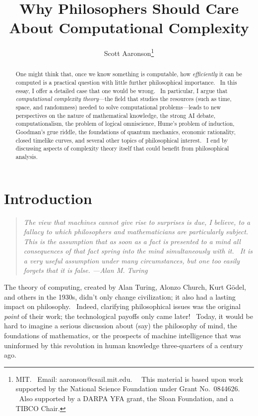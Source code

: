 \documentclass[12pt,onecolumn]{article}%
\begin{document}
\title{Why Philosophers Should Care About Computational Complexity}
\author{Scott Aaronson\thanks{MIT. \ Email: aaronson@csail.mit.edu. \ \ This material
is based upon work supported by the National Science Foundation under Grant
No.\ 0844626. \ Also supported by a DARPA YFA grant, the Sloan Foundation, and
a TIBCO Chair.}}
\date{}
\maketitle

\begin{abstract}
One might think that, once we know something is computable, how
\textit{efficiently} it can be computed is a practical question with little
further philosophical importance. \ In this essay, I offer a detailed case
that one would be wrong. \ In particular, I argue that \textit{computational
complexity theory}---the field that studies the resources (such as time,
space, and randomness) needed to solve computational problems---leads to new
perspectives on the nature of mathematical knowledge, the strong AI debate,
computationalism, the problem of logical omniscience, Hume's problem of
induction, Goodman's grue riddle, the foundations of quantum mechanics,
economic rationality, closed timelike curves, and several other topics of
philosophical interest. \ I end by discussing aspects of complexity theory
itself that could benefit from philosophical analysis.

\end{abstract}
\tableofcontents

\newpage
\section{Introduction\label{INTRO}}

\begin{quotation}
\noindent\textit{The view that machines cannot give rise to surprises is due,
I believe, to a fallacy to which philosophers and mathematicians are
particularly subject. This is the assumption that as soon as a fact is
presented to a mind all consequences of that fact spring into the mind
simultaneously with it. \ It is a very useful assumption under many
circumstances, but one too easily forgets that it is false. ---Alan M. Turing
\cite{turing:ai}}
\end{quotation}

The theory of computing, created by Alan Turing, Alonzo Church, Kurt
G\"{o}del, and others in the 1930s, didn't only change civilization; it also
had a lasting impact on philosophy. \ Indeed, clarifying philosophical issues
was the original \textit{point} of their work; the technological payoffs only
came later! \ Today, it would be hard to imagine a serious discussion about
(say) the philosophy of mind, the foundations of mathematics, or the prospects
of machine intelligence that was uninformed by this revolution in human
knowledge three-quarters of a century ago.
\end{document}
